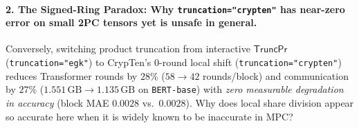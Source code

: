\documentclass[11pt]{article}
\begin{document}
\paragraph{2. The Signed-Ring Paradox: Why \texttt{truncation="crypten"} has near-zero error on small 2PC tensors yet is unsafe in general.}
Conversely, switching product truncation from interactive $\mathsf{TruncPr}$ (\texttt{truncation="egk"}) to CrypTen's 0-round local shift (\texttt{truncation="crypten"}) reduces Transformer rounds by \textbf{$28\%$} ($58 \to 42$ rounds/block) and communication by \textbf{$27\%$} ($1.551\,\text{GB} \to 1.135\,\text{GB}$ on \texttt{BERT-base}) with \emph{zero measurable degradation in accuracy} (block MAE $0.0028$ vs.\ $0.0028$). Why does local share division appear so accurate here when it is widely known to be inaccurate in MPC?
\end{document}
